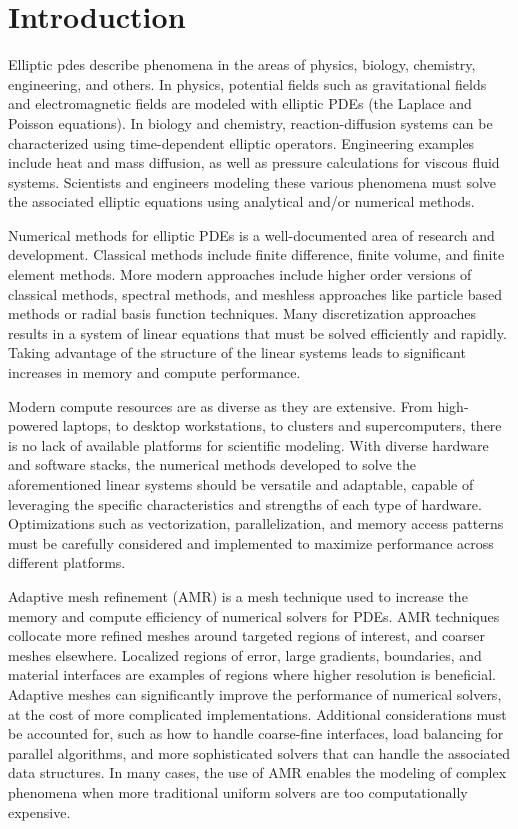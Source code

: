 \section{Introduction}

Elliptic \gls{pdes} describe phenomena in the areas of physics, biology, chemistry, engineering, and others. In physics, potential fields such as gravitational fields and electromagnetic fields are modeled with elliptic PDEs (the Laplace and Poisson equations). In biology and chemistry, reaction-diffusion systems can be characterized using time-dependent elliptic operators. Engineering examples include heat and mass diffusion, as well as pressure calculations for viscous fluid systems. Scientists and engineers modeling these various phenomena must solve the associated elliptic equations using analytical and/or numerical methods.

Numerical methods for elliptic PDEs is a well-documented area of research and development. Classical methods include finite difference, finite volume, and finite element methods. More modern approaches include higher order versions of classical methods, spectral methods, and meshless approaches like particle based methods or radial basis function techniques. Many discretization approaches results in a system of linear equations that must be solved efficiently and rapidly. Taking advantage of the structure of the linear systems leads to significant increases in memory and compute performance.

Modern compute resources are as diverse as they are extensive. From high-powered laptops, to desktop workstations, to clusters and supercomputers, there is no lack of available platforms for scientific modeling. With diverse hardware and software stacks, the numerical methods developed to solve the aforementioned linear systems should be versatile and adaptable, capable of leveraging the specific characteristics and strengths of each type of hardware. Optimizations such as vectorization, parallelization, and memory access patterns must be carefully considered and implemented to maximize performance across different platforms.

Adaptive mesh refinement (AMR) is a mesh technique used to increase the memory and compute efficiency of numerical solvers for PDEs. AMR techniques collocate more refined meshes around targeted regions of interest, and coarser meshes elsewhere. Localized regions of error, large gradients, boundaries, and material interfaces are examples of regions where higher resolution is beneficial. Adaptive meshes can significantly improve the performance of numerical solvers, at the cost of more complicated implementations. Additional considerations must be accounted for, such as how to handle coarse-fine interfaces, load balancing for parallel algorithms, and more sophisticated solvers that can handle the associated data structures. In many cases, the use of AMR enables the modeling of complex phenomena when more traditional uniform solvers are too computationally expensive.

